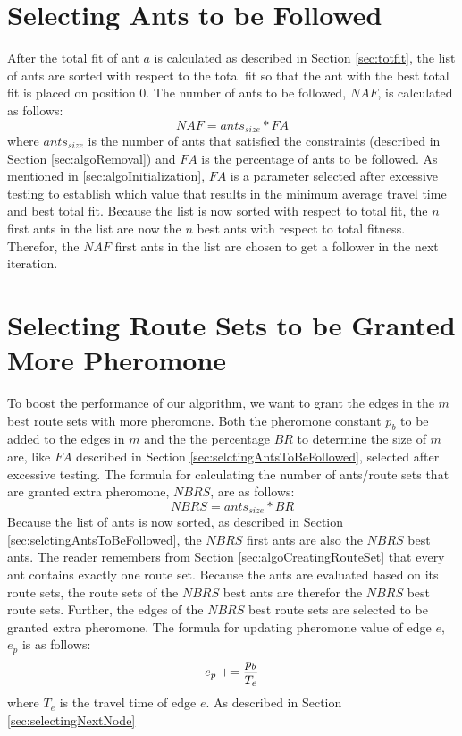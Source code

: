 \section{Selecting Ants to be Followed}
\label{sec:selctingAntsToBeFollowed}
After the total fit of ant $a$ is calculated as described in Section \vref{sec:totfit}, the list of ants are sorted with respect to the total fit so that the ant with the best total fit is placed on position 0. The number of ants to be followed, $NAF$, is calculated as follows:
\newline
$$NAF = ants_{size} * FA$$
\newline 
where $ants_{size}$ is the number of ants that satisfied the constraints (described in Section \vref{sec:algoRemoval}) and $FA$ is the percentage of ants to be followed. As mentioned in \vref{sec:algoInitialization}, $FA$ is a parameter selected after excessive testing to establish which value that results in the minimum average travel time and best total fit. Because the list is now sorted with respect to total fit, the $n$ first ants in the list are now the $n$ best ants with respect to total fitness. Therefor, the $NAF$ first ants in the list are chosen to get a follower in the next iteration. 

\section{Selecting Route Sets to be Granted More Pheromone}
To boost the performance of our algorithm, we want to grant the edges in the $m$ best route sets with more pheromone. Both the pheromone constant $p_b$ to be added to the edges in $m$ and the the percentage $BR$ to determine the size of $m$ are, like $FA$ described in Section \vref{sec:selctingAntsToBeFollowed}, selected after excessive testing. The formula for calculating the number of ants/route sets that are granted extra pheromone, $NBRS$, are as follows:
\newline
$$NBRS = ants_{size} * BR$$
\newline
Because the list of ants is now sorted, as described in Section \vref{sec:selctingAntsToBeFollowed}, the $NBRS$ first ants are also the $NBRS$ best ants. The reader remembers from Section \vref{sec:algoCreatingRouteSet} that every ant contains exactly one route set. Because the ants are evaluated based on its route sets, the route sets of the $NBRS$ best ants are therefor the $NBRS$ best route sets. Further, the edges of the $NBRS$ best route sets are selected to be granted extra pheromone. The formula for updating pheromone value of edge $e$, $e_p$ is as follows:
\newline
$$e_p \mathrel{+}= \frac{p_b}{T_e}$$ 
\newline
where $T_e$ is the travel time of edge $e$. As described in Section \vref{sec:selectingNextNode}

